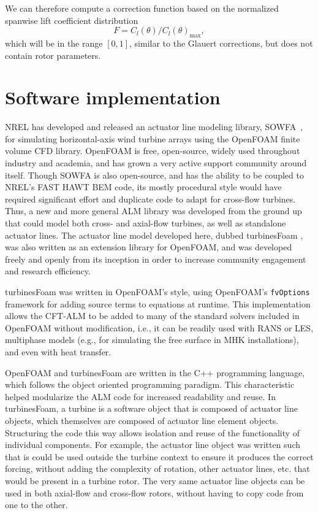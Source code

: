 \documentclass[times]{weauth}
\begin{document}
We can therefore compute a correction function based on the normalized spanwise
lift coefficient distribution
\begin{equation}
    F = C_l(\theta)/C_l(\theta)_{\max},
\end{equation}
which will be in the range $[0, 1]$, similar to the Glauert corrections, but
does not contain rotor parameters.


\section{Software implementation}

NREL has developed and released an actuator line modeling library,
SOWFA~\cite{Churchfield2014b}, for simulating horizontal-axis wind turbine
arrays using the OpenFOAM finite volume CFD library. OpenFOAM is free,
open-source, widely used throughout industry and academia, and has grown a very
active support community around itself. Though SOWFA is also open-source, and
has the ability to be coupled to NREL's FAST HAWT BEM code, its mostly
procedural style would have required significant effort and duplicate code to
adapt for cross-flow turbines. Thus, a new and more general ALM library was
developed from the ground up that could model both cross- and axial-flow
turbines, as well as standalone actuator lines. The actuator line model
developed here, dubbed turbinesFoam \cite{Bachant2016-turbinesFoam-v0.0.7}, was
also written as an extension library for OpenFOAM, and was developed freely and
openly from its inception in order to increase community engagement and research
efficiency.

turbinesFoam was written in OpenFOAM's style, using OpenFOAM's
\texttt{fvOptions} framework for adding source terms to equations at runtime.
This implementation allows the CFT-ALM to be added to many of the standard
solvers included in OpenFOAM without modification, i.e., it can be readily used
with RANS or LES, multiphase models (e.g., for simulating the free surface in
MHK installations), and even with heat transfer.

OpenFOAM and turbinesFoam are written in the C++ programming language, which
follows the object oriented programming paradigm. This characteristic helped
modularize the ALM code for increased readability and reuse. In turbinesFoam, a
turbine is a software object that is composed of actuator line objects, which
themselves are composed of actuator line element objects. Structuring the code
this way allows isolation and reuse of the functionality of individual
components. For example, the actuator line object was written such that is could
be used outside the turbine context to ensure it produces the correct forcing,
without adding the complexity of rotation, other actuator lines, etc. that would
be present in a turbine rotor. The very same actuator line objects can be used
in both axial-flow and cross-flow rotors, without having to copy code from one
to the other.
\end{document}
